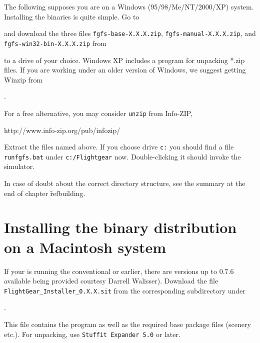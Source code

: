 The following supposes you are on a Windows (95/98/Me/NT/2000/XP)  system.
Installing the binaries is quite simple. Go to
 \medskip

  \medskip

 \noindent
and download the three files \texttt{fgfs-base-X.X.X.zip}, \texttt{fgfs-manual-X.X.X.zip}, and \texttt{fgfs-win32-bin-X.X.X.zip} from
 \medskip

\medskip

 \noindent
to a drive of your choice. Windows XP includes a program for unpacking *.zip files. If you are working under an older version of Windows, we suggest getting Winzip from
\medskip

.
\medskip

\noindent
For a free alternative, you may consider \texttt{unzip} from Info-ZIP,
\medskip

http://www.info-zip.org/pub/infozip/
\medskip

 \noindent
Extract the files named above. If you choose drive \texttt{c:} you should find a file
\texttt{runfgfs.bat} under \texttt{c:/Flightgear} now. Double-clicking it should invoke
the simulator.

In case of doubt about the correct directory structure, see the summary at the
end of chapter \~ref{building}.

\section{Installing the binary distribution on a Macintosh system}

If your  is running the conventional  or earlier, there are versions up to \FlightGear{} 0.7.6 available being provided courtesy Darrell
Walisser). Download the file \verb/FlightGear_Installer_0.X.X.sit/ from the corresponding subdirectory under
 \medskip

.
 \medskip

 \noindent
This file contains the program as well as the required base package files (scenery etc.).
For unpacking, use \texttt{Stuffit Expander 5.0} or later.

